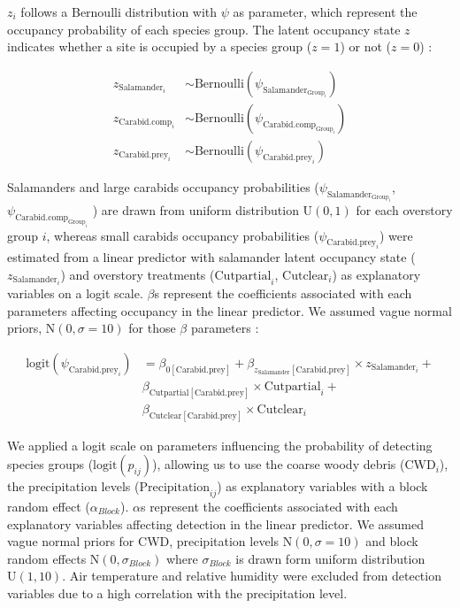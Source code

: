 $z_{i}$ follows a Bernoulli distribution with $\psi$ as parameter, 
which represent the occupancy probability of each species group. 
The latent occupancy state $z$ indicates whether a site is occupied by a species group ($z = 1$) or not ($z = 0$) :


\begin{align}
  z_{\text{Salamander}_i} &\sim \text{Bernoulli}(\psi_{\text{Salamander}_{\text{Group}_i}}) \nonumber \\
  z_{\text{Carabid.comp}_i} &\sim \text{Bernoulli}(\psi_{\text{Carabid.comp}_{\text{Group}_i}}) \\
  z_{\text{Carabid.prey}_i} &\sim \text{Bernoulli}(\psi_{\text{Carabid.prey}_{i}}) \nonumber
\end{align}


Salamanders and large carabids occupancy probabilities ($\psi_{\text{Salamander}_{\text{Group}_i}}$, $\psi_{\text{Carabid.comp}_{\text{Group}_i}}$ ) are drawn from uniform distribution $\text{U}(0, 1)$ for each overstory group $i$, 
whereas small carabids occupancy probabilities ($\psi_{\text{Carabid.prey}_{i}}$) were estimated from a linear predictor with salamander latent occupancy state ($z_{\text{Salamander}_i}$) and overstory treatments 
($\text{Cutpartial}_i$, $\text{Cutclear}_i$) as explanatory variables on a logit scale. 
$\beta$s represent the coefficients associated with each parameters affecting occupancy in the linear predictor. 
We assumed vague normal priors, $\text{N}(0, \sigma = 10)$ for those $\beta$ parameters :


\begin{align}
  \text{logit}(\psi_{\text{Carabid.prey}_i}) &= \beta_{0[\text{Carabid.prey}]} + \beta_{z_{\text{Salamander}}[\text{Carabid.prey}]} \times z_{\text{Salamander}_i} + \nonumber \\
  &\beta_{\text{Cutpartial}[\text{Carabid.prey}]} \times \text{Cutpartial}_i + \\
  &\beta_{\text{Cutclear}[\text{Carabid.prey}]} \times \text{Cutclear}_i \nonumber
\end{align}

We applied a logit scale on parameters influencing the probability of detecting species groups ($\text{logit}(p_{ij})$), allowing us to use 
the coarse woody debris ($\text{CWD}_i$), the precipitation levels ($\text{Precipitation}_{ij}$) as explanatory variables with a block random effect ($\alpha_{Block}$). 
$\alpha$s represent the coefficients associated with each explanatory variables affecting detection in the linear predictor. 
We assumed vague normal priors for CWD, precipitation levels $\text{N}(0, \sigma = 10)$ and block random effects $\text{N}(0, \sigma_{Block})$ 
where $\sigma_{Block}$ is drawn form uniform distribution $\text{U}(1, 10)$. 
Air temperature and relative humidity were excluded from detection variables due to a high correlation with the precipitation level.


